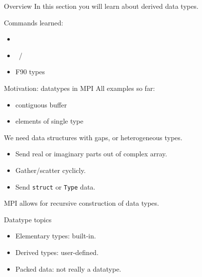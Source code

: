 
\begin{numberedframe}{Overview}
  In this section you will learn about derived data types.

  Commands learned:
  \begin{itemize}
  \item {}
  \item {}~/ 
  \item F90 types
  \end{itemize}
\end{numberedframe}

\begin{numberedframe}{Motivation: datatypes in MPI}
  All examples so far: 
  \begin{itemize}
  \item contiguous buffer
  \item elements of single type
  \end{itemize}
  We need data structures with gaps, or heterogeneous types.
  \begin{itemize}
  \item Send real or imaginary parts out of complex array.
  \item Gather/scatter cyclicly.
  \item Send \lstinline{struct} or \lstinline{Type} data.
  \end{itemize}
  MPI allows for recursive construction of data types.
\end{numberedframe}

\begin{numberedframe}{Datatype topics}
  \begin{itemize}
  \item Elementary types: built-in.
  \item Derived types: user-defined.
  \item Packed data: not really a datatype.
  \end{itemize}
\end{numberedframe}

